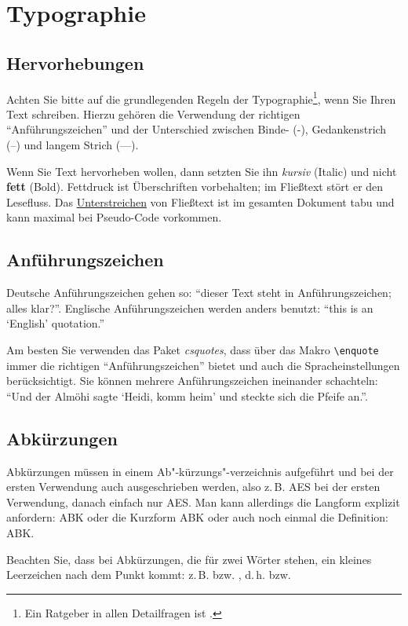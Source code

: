 \documentclass[conference,compsoc,final,a4paper]{IEEEtran}
\begin{document}
\section{Typographie}
\subsection{Hervorhebungen}\label{Einleitung:Textauszeichnungen}
Achten Sie bitte auf die grundlegenden Regeln der Typographie\footnote{Ein Ratgeber in allen Detailfragen ist \cite{Forssman2002}.}, wenn Sie Ihren Text schreiben. Hierzu gehören \zb die Verwendung der richtigen "`Anführungszeichen"' und der Unterschied zwischen Binde- (-), Gedankenstrich (--) und langem Strich (---).

Wenn Sie Text hervorheben wollen, dann setzten Sie ihn \textit{kursiv} (Italic) und nicht \textbf{fett} (Bold). Fettdruck ist Überschriften vorbehalten; im Fließtext stört er den Lesefluss. Das \underline{Unterstreichen} von Fließtext ist im gesamten Dokument tabu und kann maximal bei Pseudo-Code vorkommen.

\subsection{Anführungszeichen}
Deutsche Anführungszeichen gehen so: "`dieser Text steht in \glq Anführungszeichen\grq; alles klar?"'. Englische Anführungszeichen werden anders benutzt: ``this is an `English' quotation.''

Am besten Sie verwenden das Paket \textit{csquotes}, dass über das Makro \lstinline+\enquote+ immer die richtigen \enquote{Anführungszeichen} bietet und auch die Spracheinstellungen berücksichtigt. Sie können mehrere Anführungszeichen ineinander schachteln: \enquote{Und der Almöhi sagte \enquote{Heidi, komm heim} und steckte sich die Pfeife an.}.

\subsection{Abkürzungen}
Abkürzungen müssen in einem Ab"-kürzungs"-verzeichnis aufgeführt und bei der ersten Verwendung auch ausgeschrieben werden, also z.\,B. \ac{AES} bei der ersten Verwendung, danach einfach nur \ac{AES}. Man kann allerdings die Langform explizit anfordern: \acl{ABK} oder die Kurzform \acs{ABK} oder auch noch einmal die Definition: \acf{ABK}.

Beachten Sie, dass bei Abkürzungen, die für zwei Wörter stehen, ein kleines Leerzeichen nach dem Punkt kommt: z.\,B. bzw. \zb, d.\,h. bzw. \dahe
\end{document}
